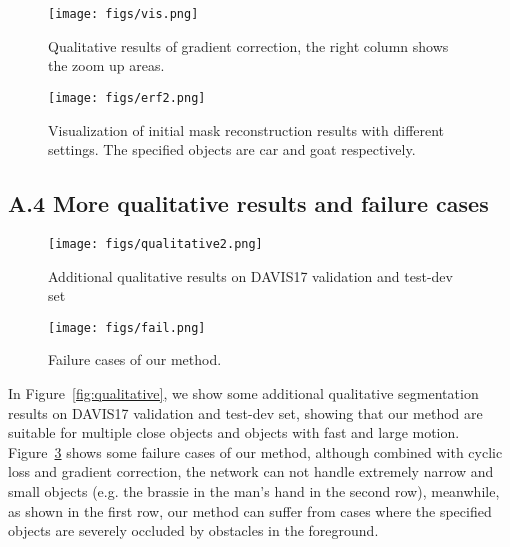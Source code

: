 \documentclass{article}
\begin{document}
\begin{figure}
    \centering
    \small
    \texttt{[image: figs/vis.png]}
    \caption{Qualitative results of gradient correction, the right column shows the zoom up areas.}
    \label{fig:correction}
    \vspace{-3mm}
\end{figure}

\begin{figure}[t]
    \centering
    \texttt{[image: figs/erf2.png]}
    \caption{Visualization of initial mask reconstruction results with different settings. The specified objects are car and goat respectively.}
    \label{fig:erf}
\end{figure}

\subsection*{A.4 More qualitative results and failure cases}
\begin{figure}
\begin{minipage}{\textwidth}
    \centering
    \texttt{[image: figs/qualitative2.png]}
    \caption{Additional qualitative results on DAVIS17 validation and test-dev set}
    \label{fig:qualitative}
\end{minipage}

\begin{minipage}{\textwidth}
    \centering
    \texttt{[image: figs/fail.png]}
    \caption{Failure cases of our method.}
    \label{fig:fail}
\end{minipage}
\end{figure}
In Figure~\ref{fig:qualitative}, we show some additional qualitative segmentation results on DAVIS17 validation and test-dev set, showing that our method are suitable for multiple close objects and objects with fast and large motion. Figure~\ref{fig:fail} shows some failure cases of our method, although combined with cyclic loss and gradient correction, the network can not handle extremely narrow and small objects (e.g. the brassie in the man's hand in the second row), meanwhile, as shown in the first row, our method can suffer from cases where the specified objects are severely occluded by obstacles in the foreground.
\end{document}
